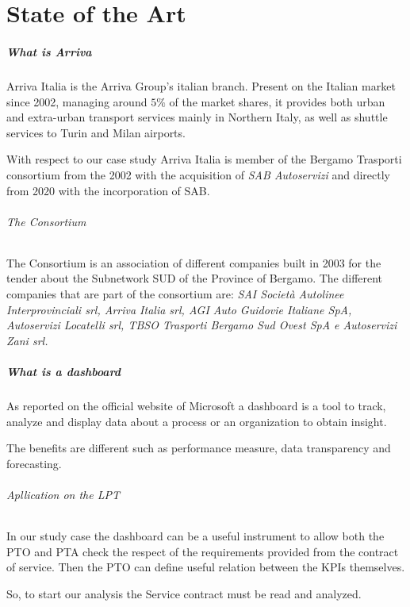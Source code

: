 \chapter{State of the Art}

\paragraph{What is Arriva}
Arriva Italia is the Arriva Group’s italian branch. Present on the Italian market since 2002, managing around $5\%$ of the market shares, it provides both urban and extra-urban transport services mainly in Northern Italy, as well as shuttle services to Turin and Milan airports.

With respect to our case study Arriva Italia is member of the Bergamo Trasporti consortium from the 2002 with the acquisition of \emph{SAB Autoservizi} and directly from 2020 with the incorporation of SAB.

\subparagraph{The Consortium}
The Consortium is an association of different companies built in 2003 for the tender about the Subnetwork SUD of the Province of Bergamo.
The different companies that are part of the consortium are: \emph{SAI Società Autolinee Interprovinciali srl, Arriva Italia srl, AGI Auto Guidovie Italiane SpA, Autoservizi Locatelli srl, TBSO Trasporti Bergamo Sud Ovest SpA e Autoservizi Zani srl.}

\paragraph{What is a dashboard}
As reported on the official website of Microsoft a dashboard is a tool to track, analyze and display data about a process or an organization to obtain insight.

The benefits are different such as performance measure, data transparency and forecasting.


\subparagraph{Apllication on the LPT\cite{rossiPTM}}

In our study case the dashboard can be a useful instrument to allow both the PTO and PTA check the respect of the requirements provided from the contract of service. Then the PTO can define useful relation between the KPIs themselves. 

So, to start our analysis the Service contract must be read and analyzed.